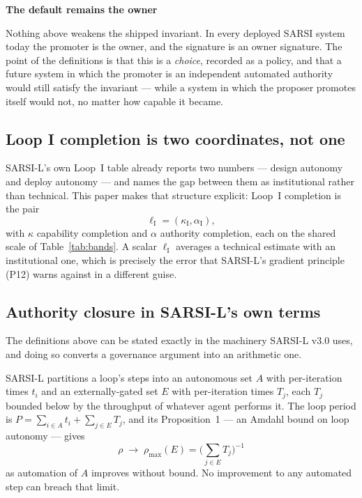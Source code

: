 \documentclass[11pt]{article}
\newenvironment{claimbox}[1]{%
  \begin{shaded}\noindent\textbf{#1}\par\smallskip}{%
  \end{shaded}}
\begin{document}
\begin{claimbox}{The default remains the owner}
Nothing above weakens the shipped invariant. In every deployed SARSI system today the promoter is the owner, and the signature is an owner signature. The point of the definitions is that this is a \emph{choice}, recorded as a policy, and that a future system in which the promoter is an independent automated authority would still satisfy the invariant --- while a system in which the proposer promotes itself would not, no matter how capable it became.
\end{claimbox}

\subsection{Loop I completion is two coordinates, not one}
SARSI-L's own Loop~I table already reports two numbers --- design autonomy and deploy autonomy --- and names the gap between them as institutional rather than technical. This paper makes that structure explicit: Loop~I completion is the pair
\begin{equation}
\ell_{\mathrm{I}} = (\kappa_{\mathrm{I}}, \alpha_{\mathrm{I}}),
\label{eq:loopI}
\end{equation}
with $\kappa$ capability completion and $\alpha$ authority completion, each on the shared scale of Table~\ref{tab:bands}. A scalar $\ell_{\mathrm{I}}$ averages a technical estimate with an institutional one, which is precisely the error that SARSI-L's gradient principle (P12) warns against in a different guise.

\subsection{Authority closure in SARSI-L's own terms}
\label{sec:amdahl}

The definitions above can be stated exactly in the machinery SARSI-L v3.0 uses, and doing so converts a governance argument into an arithmetic one.

SARSI-L partitions a loop's steps into an autonomous set $A$ with per-iteration times $t_i$ and an externally-gated set $E$ with per-iteration times $T_j$, each $T_j$ bounded below by the throughput of whatever agent performs it. The loop period is $P=\sum_{i\in A}t_i+\sum_{j\in E}T_j$, and its Proposition~1 --- an Amdahl bound on loop autonomy --- gives
\begin{equation}
\rho \;\longrightarrow\; \rho_{\max}(E)=\Big(\sum_{j\in E}T_j\Big)^{-1}
\label{eq:amdahl}
\end{equation}
as automation of $A$ improves without bound. No improvement to any automated step can breach that limit.
\end{document}
